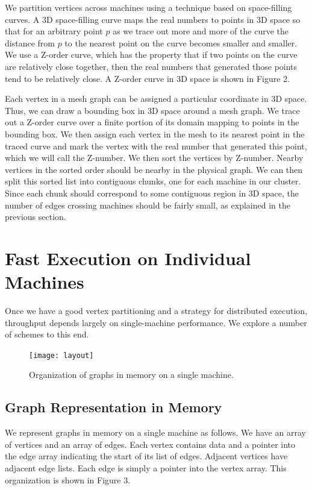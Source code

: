 \documentclass[journal]{IEEEtran}
\begin{document}
We partition vertices across machines using a technique based on space-filling curves. A 3D space-filling curve maps the real numbers to points in 3D space so that for an arbitrary point $p$ as we trace out more and more of the curve the distance from $p$ to the nearest point on the curve becomes smaller and smaller. We use a Z-order curve, which has the property that if two points on the curve are relatively close together, then the real numbers that generated those points tend to be relatively close. A Z-order curve in 3D space is shown in Figure 2.

Each vertex in a mesh graph can be assigned a particular coordinate in 3D space. Thus, we can draw a bounding box in 3D space around a mesh graph. We trace out a Z-order curve over a finite portion of its domain mapping to points in the bounding box. We then assign each vertex in the mesh to its nearest point in the traced curve and mark the vertex with the real number that generated this point, which we will call the Z-number. We then sort the vertices by Z-number. Nearby vertices in the sorted order should be nearby in the physical graph. We can then split this sorted list into contiguous chunks, one for each machine in our cluster. Since each chunk should correspond to some contiguous region in 3D space, the number of edges crossing machines should be fairly small, as explained in the previous section.

\section{Fast Execution on Individual Machines}

Once we have a good vertex partitioning and a strategy for distributed execution, throughput depends largely on single-machine performance. We explore a number of schemes to this end.

\begin{figure}[ht]
\centering
\texttt{[image: layout]}
\caption{Organization of graphs in memory on a single machine.}
\label{fig_layout}
\end{figure}

\subsection{Graph Representation in Memory}
We represent graphs in memory on a single machine as follows. We have an array of vertices and an array of edges. Each vertex contains data and a pointer into the edge array indicating the start of its list of edges. Adjacent vertices have adjacent edge lists. Each edge is simply a pointer into the vertex array. This organization is shown in Figure 3.
\end{document}
